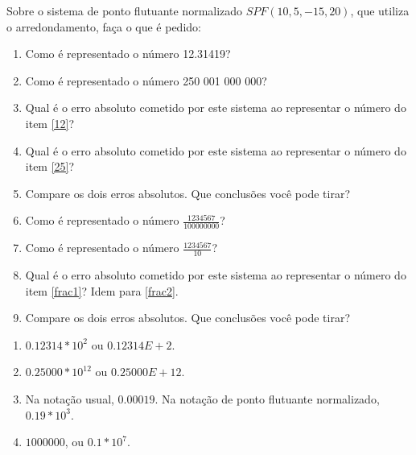 \begin{ex}
Sobre o sistema de ponto flutuante normalizado $SPF (10,5,-15,20)$, que utiliza o arredondamento, faça o que é pedido:
\begin{enumerate}[label=\alph*)]
\item Como é representado o número 12.31419? \label{12}
\item Como é representado o número 250 001 000 000? \label{25}
\item Qual é o erro absoluto cometido por este sistema ao representar o número do item \ref{12}?
\item Qual é o erro absoluto cometido por este sistema ao representar o número do item \ref{25}?
\item Compare os dois erros absolutos. Que conclusões você pode tirar?
\item Como é representado o número $\frac{1234567}{100000000}$?\label{frac1}
\item Como é representado o número $\frac{1234567}{10}$?\label{frac2}
\item Qual é o erro absoluto cometido por este sistema ao representar o número do item \ref{frac1}? Idem para \ref{frac2}.
\item Compare os dois erros absolutos. Que conclusões você pode tirar?
\end{enumerate}
\begin{sol}
\begin{enumerate}[label=\alph*)]
\item $0.12314*10^2$ ou $0.12314E+2$.
\item $0.25000*10^{12}$ ou $0.25000E+12$.
\item Na notação usual, $0.00019$. Na notação de ponto flutuante normalizado, $0.19*10^3$.
\item $1000000$, ou $0.1*10^7$.
\end{enumerate}
\end{sol}
\end{ex}


